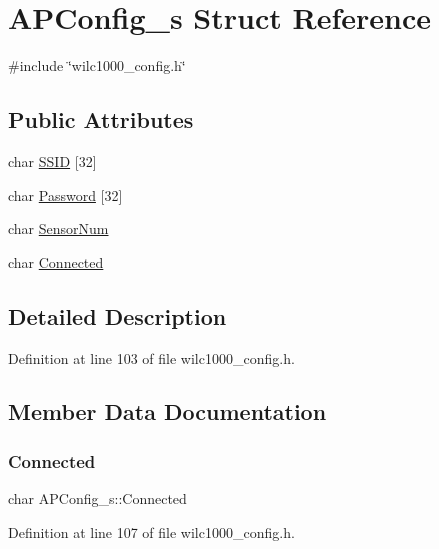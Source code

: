 \hypertarget{structAPConfig__s}{}\section{A\+P\+Config\+\_\+s Struct Reference}
\label{structAPConfig__s}


{\ttfamily \#include \char`\"{}wilc1000\+\_\+config.\+h\char`\"{}}

\subsection*{Public Attributes}
\begin{DoxyCompactItemize}
\item 
char \hyperlink{structAPConfig__s_adade6d799e6a8e55802da0cfb29e0c81}{S\+S\+ID} \mbox{[}32\mbox{]}
\item 
char \hyperlink{structAPConfig__s_a747595d1ce094cbbe7ca0bc0c060d906}{Password} \mbox{[}32\mbox{]}
\item 
char \hyperlink{structAPConfig__s_ae720f9e917e48652652e2ee31881c1ea}{Sensor\+Num}
\item 
char \hyperlink{structAPConfig__s_a19fb307c3e747e9694f55dbbd43bd1a2}{Connected}
\end{DoxyCompactItemize}


\subsection{Detailed Description}


Definition at line 103 of file wilc1000\+\_\+config.\+h.



\subsection{Member Data Documentation}
\mbox{\label{structAPConfig__s_a19fb307c3e747e9694f55dbbd43bd1a2}} 
\subsubsection{\texorpdfstring{Connected}{Connected}}
{\footnotesize\ttfamily char A\+P\+Config\+\_\+s\+::\+Connected}



Definition at line 107 of file wilc1000\+\_\+config.\+h.

